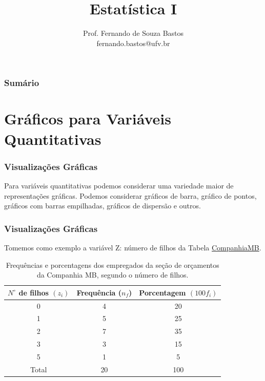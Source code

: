 \documentclass[14pt,aspectratio=1610]{beamer}
\title{Estatística I}
\author{Prof. Fernando de Souza Bastos \texorpdfstring{\\ fernando.bastos@ufv.br}{}}
\institute{Departamento de Estatística \texorpdfstring{\\ Universidade Federal de Viçosa}{}\texorpdfstring{\\ Campus UFV - Viçosa}{}}
\date{}
\begin{document}
%

\frame{\titlepage}

\begin{frame}{}
\frametitle{\bf Sumário}
\tableofcontents
\end{frame}

\section{Gráficos para Variáveis Quantitativas}
\begin{frame}{}
\frametitle{Visualizações Gráficas}
\begin{block}{}
\justifying
Para variáveis quantitativas podemos considerar uma variedade maior de representações gráficas. Podemos considerar gráficos de barra, gráfico de pontos, gráficos com barras empilhadas, gráficos de dispersão e outros.  
\end{block}
\nocite{Apostila}
\end{frame}

\begin{frame}{}
\frametitle{Visualizações Gráficas}
\begin{block}{}
\justifying
Tomemos como exemplo a variável Z: número de filhos da Tabela \href{https://raw.githack.com/ufvest/ufvest.github.io/master/Aulas_EST105/CompanhiaMB.html}{CompanhiaMB}.
\begin{table}[ht]
\centering
\caption{Frequências e porcentagens dos
empregados da seção de orçamentos
da Companhia MB, segundo
o número de filhos.}
\begin{tabular}{c|c|c}
  \hline
 $N^{\circ}$ de filhos $(z_{i})$ & Frequência ($n_{f}$) & Porcentagem $(100f_{i})$ \\ 
  \hline
  0 & 4 & 20 \\ 
  1 & 5 & 25 \\ 
  2 & 7 & 35 \\ 
  3 & 3 & 15 \\ 
  5 & 1 & 5  \\ 
  \hline
Total& 20 & 100\\
\hline
\end{tabular}
\end{table}
\end{block}
\end{frame}
\end{document}
